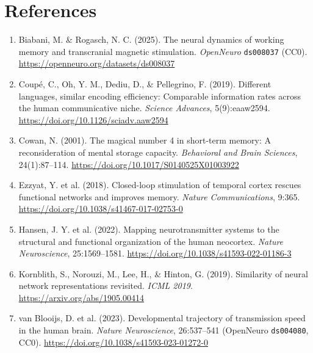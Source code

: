 \documentclass[11pt,a4paper]{article}
\begin{document}
\section*{References}
\begin{enumerate}
\item Biabani, M. \& Rogasch, N. C. (2025). The neural dynamics of working memory and transcranial magnetic stimulation. \emph{OpenNeuro} \texttt{ds008037} (CC0). \url{https://openneuro.org/datasets/ds008037}
\item Coupé, C., Oh, Y. M., Dediu, D., \& Pellegrino, F. (2019). Different languages, similar encoding efficiency: Comparable information rates across the human communicative niche. \emph{Science Advances}, 5(9):eaaw2594. \url{https://doi.org/10.1126/sciadv.aaw2594}
\item Cowan, N. (2001). The magical number 4 in short-term memory: A reconsideration of mental storage capacity. \emph{Behavioral and Brain Sciences}, 24(1):87--114. \url{https://doi.org/10.1017/S0140525X01003922}
\item Ezzyat, Y. et al. (2018). Closed-loop stimulation of temporal cortex rescues functional networks and improves memory. \emph{Nature Communications}, 9:365. \url{https://doi.org/10.1038/s41467-017-02753-0}
\item Hansen, J. Y. et al. (2022). Mapping neurotransmitter systems to the structural and functional organization of the human neocortex. \emph{Nature Neuroscience}, 25:1569--1581. \url{https://doi.org/10.1038/s41593-022-01186-3}
\item Kornblith, S., Norouzi, M., Lee, H., \& Hinton, G. (2019). Similarity of neural network representations revisited. \emph{ICML 2019}. \url{https://arxiv.org/abs/1905.00414}
\item van Blooijs, D. et al. (2023). Developmental trajectory of transmission speed in the human brain. \emph{Nature Neuroscience}, 26:537--541 (OpenNeuro \texttt{ds004080}, CC0). \url{https://doi.org/10.1038/s41593-023-01272-0}
\end{enumerate}
\end{document}

